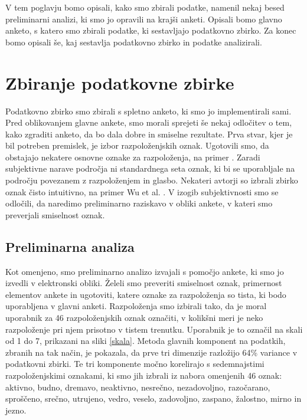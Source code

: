 \documentclass[a4paper, 12pt]{book}
\begin{document}
{V tem poglavju bomo opisali, kako smo zbirali podatke, namenil nekaj besed preliminarni analizi, ki smo jo opravili na krajši anketi. Opisali bomo glavno anketo, s katero smo zbirali podatke, ki sestavljajo podatkovno zbirko. Za konec bomo opisali še, kaj sestavlja podatkovno zbirko in podatke analizirali. 


\section{Zbiranje podatkovne zbirke}

Podatkovno zbirko smo zbirali s spletno anketo, ki smo jo implementirali sami. Pred oblikovanjem glavne ankete, smo morali sprejeti še nekaj odločitev o tem, kako zgraditi anketo, da bo dala dobre in smiselne rezultate. Prva stvar, kjer je bil potreben premislek, je izbor razpoloženjskih oznak. Ugotovili smo, da obstajajo nekatere osnovne oznake za razpoloženja, na primer \cite{dalgleish1999handbook}. Zaradi subjektivne narave področja ni standardnega seta oznak, ki bi se uporabljale na področju povezanem z razpoloženjem in glasbo. Nekateri avtorji so izbrali zbirko oznak čisto intuitivno, na primer Wu et al. \cite{Wu2013}. V izogib subjektivnosti smo se odločili, da naredimo preliminarno raziskavo v obliki ankete, v kateri smo preverjali smiselnost oznak. 

\subsection{Preliminarna analiza}
\label{preiliminarnaana}

Kot omenjeno, smo preliminarno analizo izvajali s pomočjo ankete, ki smo jo izvedli v elektronski obliki. Želeli smo preveriti smiselnost oznak, primernost elementov ankete in ugotoviti, katere oznake za razpoloženja so tista, ki bodo uporabljena v glavni anketi. Razpoloženja smo izbirali tako, da je moral uporabnik za 46 razpoloženjskih oznak označiti, v kolikšni meri je neko razpoloženje pri njem prisotno v tistem trenutku. Uporabnik je to označil na skali od 1 do 7, prikazani na sliki \ref{skala}. Metoda glavnih komponent na podatkih, zbranih na tak način, je pokazala, da prve tri dimenzije razložijo 64\% variance v podatkovni zbirki. Te tri komponente močno korelirajo s sedemnajstimi razpoloženjskimi oznakami, ki smo jih izbrali iz nabora omenjenih 46 oznak: aktivno, budno, dremavo, neaktivno, nesrečno, nezadovoljno, razočarano, sproščeno, srečno, utrujeno, vedro, veselo, zadovoljno, zaspano, žalostno, mirno in jezno.

}
\end{document}
